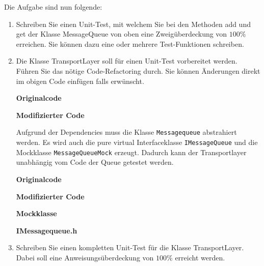 Die Aufgabe sind nun folgende:
\begin{enumerate}
\itemsep0em
\item Schreiben Sie einen Unit-Test, mit welchem Sie bei den Methoden add und get der Klasse MessageQueue von oben eine Zweigüberdeckung von $100\%$ erreichen. Sie können dazu eine oder mehrere Test-Funktionen schreiben.


\item Die Klasse TransportLayer soll für einen Unit-Test vorbereitet werden. Führen Sie das nötige Code-Refactoring durch. Sie können Änderungen direkt im obigen Code einfügen falls erwünscht.

\begin{minipage}[t]{0.46\textwidth}
\textbf{Originalcode}

\end{minipage}
\hfill
\begin{minipage}[t]{0.46\textwidth}
\textbf{Modifizierter Code}

\end{minipage}

Aufgrund der Dependencies muss die Klasse \texttt{Messagequeue} abstrahiert werden. Es wird auch die pure virtual Interfaceklasse \texttt{IMessageQueue} und die Mockklasse \texttt{MessageQueueMock} erzeugt. Dadurch kann der Transportlayer unabhängig vom Code der Queue getestet werden.

\begin{minipage}[t]{0.46\textwidth}
\textbf{Originalcode}

\end{minipage}
\hfill
\begin{minipage}[t]{0.46\textwidth}
\textbf{Modifizierter Code}

\end{minipage}

\begin{minipage}[t]{0.46\textwidth}
\textbf{Mockklasse}

\end{minipage}
\hfill
\begin{minipage}[t]{0.46\textwidth}
\textbf{IMessagequeue.h}

\end{minipage}


\item Schreiben Sie einen kompletten Unit-Test für die Klasse TransportLayer. Dabei soll eine Anweisungsüberdeckung von $100\%$ erreicht werden.



\end{enumerate}


